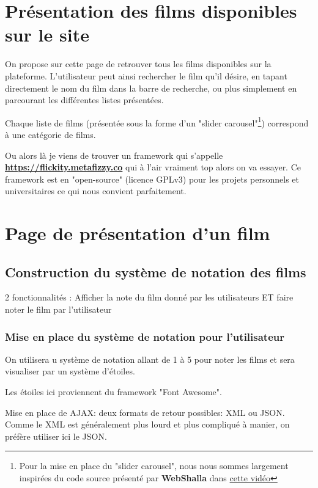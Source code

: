\documentclass[a4paper, 11pt]{MyReport}
\begin{document}
		\section{Présentation des films disponibles sur le site}

			On propose sur cette page de retrouver tous les films disponibles sur la plateforme. L'utilisateur peut ainsi rechercher le film qu'il désire, en tapant directement le nom du film dans la barre de recherche, ou plus simplement en parcourant les différentes listes présentées.

			Chaque liste de films (présentée sous la forme d'un "slider carousel"\footnote{Pour la mise en place du "slider carousel", nous nous sommes largement inspirées du code source présenté par {\bfseries WebShalla} dans \href{https://www.youtube.com/watch?v=Gi4CTYOs7J4}{cette vidéo} }) correspond à une catégorie de films.

			Ou alors là je viens de trouver un framework qui s'appelle {\bfseries \href{Flickity}{https://flickity.metafizzy.co} } qui à l'air vraiment top alors on va essayer. Ce framework est en "open-source" (licence GPLv3) pour les projets personnels et universitaires ce qui nous convient parfaitement.


		\section{Page de présentation d'un film}

			\subsection{Construction du système de notation des films}
				2 fonctionnalités : Afficher la note du film donné par les utilisateurs ET faire noter le film par l'utilisateur

				\subsubsection{Mise en place du système de notation pour l'utilisateur}

					On utilisera u système de notation allant de 1 à 5 pour noter les films et sera visualiser par un système d'étoiles.

					Les étoiles ici proviennent du framework "Font Awesome".

					\bigskip
					Mise en place de AJAX: deux formats de retour possibles: XML ou JSON. Comme le XML est généralement plus lourd et plus compliqué à manier, on préfère utiliser ici le JSON.
\end{document}
